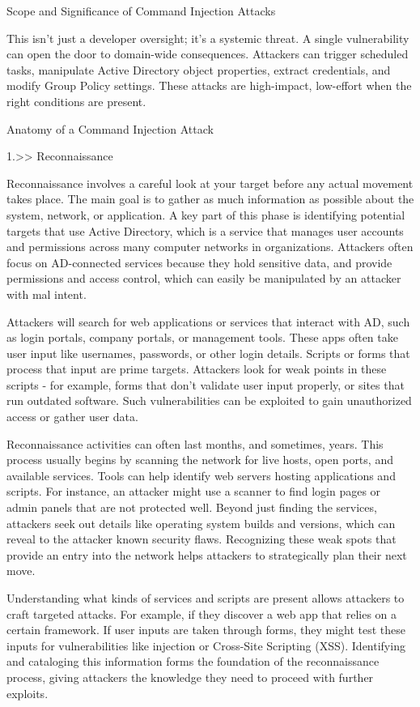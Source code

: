 Scope and Significance of Command Injection Attacks

This isn’t just a developer oversight; it’s a systemic threat. A single vulnerability can open the door to domain-wide consequences. Attackers can trigger scheduled tasks, manipulate Active Directory object properties, extract credentials, and modify Group Policy settings. These attacks are high-impact, low-effort when the right conditions are present.

Anatomy of a Command Injection Attack

1.>> Reconnaissance

Reconnaissance involves a careful look at your target before any actual movement takes place. The main goal is to gather as much information as possible about the system, network, or application. A key part of this phase is identifying potential targets that use Active Directory, which is a service that manages user accounts and permissions across many computer networks in organizations. Attackers often focus on AD-connected services because they hold sensitive data, and provide permissions and access control, which can easily be manipulated by an attacker with mal intent.

Attackers will search for web applications or services that interact with AD, such as login portals, company portals, or management tools. These apps often take user input like usernames, passwords, or other login details. Scripts or forms that process that input are prime targets. Attackers look for weak points in these scripts - for example, forms that don’t validate user input properly, or sites that run outdated software. Such vulnerabilities can be exploited to gain unauthorized access or gather user data.

Reconnaissance activities can often last months, and sometimes, years. This process usually begins by scanning the network for live hosts, open ports, and available services. Tools can help identify web servers hosting applications and scripts. For instance, an attacker might use a scanner to find login pages or admin panels that are not protected well. Beyond just finding the services, attackers seek out details like operating system builds and versions, which can reveal to the attacker known security flaws. Recognizing these weak spots that provide an entry into the network helps attackers to strategically plan their next move.

Understanding what kinds of services and scripts are present allows attackers to craft targeted attacks. For example, if they discover a web app that relies on a certain framework. If user inputs are taken through forms, they might test these inputs for vulnerabilities like injection or Cross-Site Scripting (XSS). Identifying and cataloging this information forms the foundation of the reconnaissance process, giving attackers the knowledge they need to proceed with further exploits.

